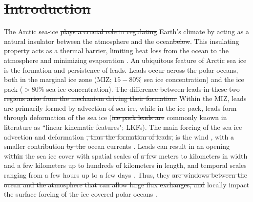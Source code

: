 \documentclass[lineno,sn-basic]{sn-jnl}%
\providecommand{\DIFadd}[1]{{\protect\color{blue}\uwave{#1}}} %
\providecommand{\DIFdel}[1]{{\protect\color{red}\sout{#1}}}                      %
\providecommand{\DIFaddbegin}{} %
\providecommand{\DIFaddend}{} %
\providecommand{\DIFdelbegin}{} %
\providecommand{\DIFdelend}{} %
\newcommand{\DIFscaledelfig}{0.5}
\newlength{\DIFdelgraphicswidth} %
\newlength{\DIFdelgraphicsheight} %
\newcommand{\DIFaddincludegraphics}[2][]{{\color{blue}\fbox{\DIFOincludegraphics[#1]{#2}}}} %
\newcommand{\DIFdelincludegraphics}[2][]{%
\sbox{\DIFdelgraphicsbox}{\DIFOincludegraphics[#1]{#2}}%
\settoboxwidth{\DIFdelgraphicswidth}{\DIFdelgraphicsbox} %
\settoboxtotalheight{\DIFdelgraphicsheight}{\DIFdelgraphicsbox} %
\scalebox{\DIFscaledelfig}{%
\parbox[b]{\DIFdelgraphicswidth}{\usebox{\DIFdelgraphicsbox}\\[-\baselineskip] \rule{\DIFdelgraphicswidth}{0em}}\llap{\resizebox{\DIFdelgraphicswidth}{\DIFdelgraphicsheight}{%
\setlength{\unitlength}{\DIFdelgraphicswidth}%
\begin{picture}(1,1)%
\thicklines\linethickness{2pt} %
{\color[rgb]{1,0,0}\put(0,0){\framebox(1,1){}}}%
{\color[rgb]{1,0,0}\put(0,0){\line( 1,1){1}}}%
{\color[rgb]{1,0,0}\put(0,1){\line(1,-1){1}}}%
\end{picture}%
}\hspace*{3pt}}} %
} %
\DeclareRobustCommand{\DIFaddbegin}{\DIFOaddbegin \let\includegraphics\DIFaddincludegraphics} %
\DeclareRobustCommand{\DIFaddend}{\DIFOaddend \let\includegraphics\DIFOincludegraphics} %
\DeclareRobustCommand{\DIFdelbegin}{\DIFOdelbegin \let\includegraphics\DIFdelincludegraphics} %
\DeclareRobustCommand{\DIFdelend}{\DIFOaddend \let\includegraphics\DIFOincludegraphics} %
\begin{document}


\maketitle

\DIFdelbegin \section{\DIFdel{Introduction}}%
\addtocounter{section}{-1}%
\DIFdelend %

The Arctic sea-ice \DIFdelbegin \DIFdel{plays a crucial role in regulating }\DIFdelend \DIFaddbegin \DIFadd{regulates }\DIFaddend Earth's climate by acting as a natural insulator between the atmosphere and the ocean\DIFdelbegin \DIFdel{below}\DIFdelend . This insulating property acts as a thermal barrier, limiting heat loss from the ocean to the atmosphere and minimizing evaporation \citep{Wettlaufer_insulator_1997, Untersteiner_ice_insulator_1961}. An ubiquitous feature of Arctic sea ice is the formation and persistence of leads. Leads occur across the polar oceans, both in the marginal ice zone (MIZ; $15-80\%$ sea ice concentration) and the ice pack ($>80\%$ sea ice concentration). \DIFdelbegin \DIFdel{The difference between leads in these two regions arise from the mechanism driving their formation. }\DIFdelend Within the MIZ, leads are primarily formed by advection of sea ice, while in the ice pack, leads form through deformation of the sea ice (\DIFdelbegin \DIFdel{ice pack leads are }\DIFdelend commonly known in literature as ``linear kinematic features"; LKFs). 
The main forcing of the sea ice advection and deformation \DIFdelbegin \DIFdel{, thus the formation of leads, }\DIFdelend is the wind \citep{Linow_lkf_2017, Hutter_scaling_lkf_2018}, with a smaller contribution \DIFdelbegin \DIFdel{by the }\DIFdelend \DIFaddbegin \DIFadd{from }\DIFaddend ocean currents \citep{Willmes_leads_currents_2023}.
Leads can result in an opening \DIFdelbegin \DIFdel{within }\DIFdelend \DIFaddbegin \DIFadd{of }\DIFaddend the sea ice cover \citep{Rampal_nextsim_2016, Hutchings_model_lkf_2005, Richter_pack_stress_2002} with spatial scales of \DIFdelbegin \DIFdel{a few }\DIFdelend meters to kilometers in width and a few kilometers up to hundreds of kilometers in length, and temporal scales ranging from a few hours up to a few days \citep{Linow_lkf_2017, Wernecke_Lead_2015, Tschudi_obs_leads_1998}. Thus, they \DIFdelbegin \DIFdel{are windows between the ocean and the atmosphere that can allow large flux exchanges, and }\DIFdelend \DIFaddbegin \DIFadd{can }\DIFaddend locally impact the surface forcing \DIFdelbegin \DIFdel{of }\DIFdelend \DIFaddbegin \DIFadd{in }\DIFaddend the ice covered polar oceans \citep{Lupkes_leads_2008}.
\end{document}
